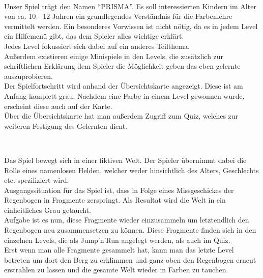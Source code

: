 \documentclass[10pt,a4paper,notitlepage]{report}
\begin{document}
	\\\par\medskip\Text
	Unser Spiel trägt den Namen \enquote{PRISMA}. Es soll interessierten Kindern im Alter von ca. 10 - 12 Jahren ein grundlegendes Verständnis für die Farbenlehre vermittelt werden. Ein besonderes Vorwissen ist nicht nötig, da es in jedem Level ein Hilfemenü gibt, das dem Spieler alles wichtige erklärt.\\
	Jedes Level fokussiert sich dabei auf ein anderes Teilthema.\\
	Außerdem existieren einige Minispiele in den Levels, die zusätzlich zur schriftlichen Erklärung dem Spieler die Möglichkeit geben das eben gelernte auszuprobieren.\\
	Der Spielfortschritt wird anhand der Übersichtskarte angezeigt. Diese ist am Anfang komplett grau. Nachdem eine Farbe in einem Level gewonnen wurde, erscheint diese auch auf der Karte.\\
	Über die Übersichtskarte hat man außerdem Zugriff zum Quiz, welches zur weiteren Festigung des Gelernten dient.\\\par\smallskip
	
	\\\par\medskip\Text
	Das Spiel bewegt sich in einer fiktiven Welt. Der Spieler übernimmt dabei die Rolle eines namenlosen Helden, welcher weder hinsichtlich des Alters, Geschlechts etc. spezifiziert wird.\\
	Ausgangssituation für das Spiel ist, dass in Folge eines Missgeschickes der Regenbogen in Fragmente zerspringt. Als Resultat wird die Welt in ein einheitliches Grau getaucht.\\
	Aufgabe ist es nun, diese Fragmente wieder einzusammeln um letztendlich den	Regenbogen neu zusammensetzen zu können. Diese Fragmente finden sich in den einzelnen Levels, die als Jump'n'Run angelegt werden, als auch im Quiz.\\
	Erst wenn man alle Fragmente gesammelt hat, kann man das letzte Level betreten um dort den Berg zu erklimmen und ganz oben den Regenbogen erneut erstrahlen zu lassen und die gesamte Welt wieder in Farben zu tauchen.\\\par\smallskip
	
\end{document}
